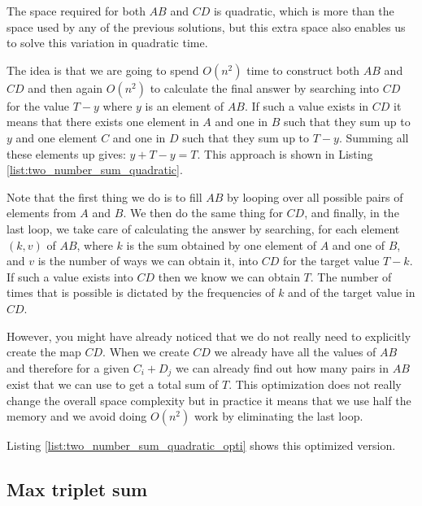 The space required for both $AB$ and $CD$ is quadratic, which is more than the space used by any of the previous solutions, but this extra space
also enables us to solve this variation in quadratic time. 

The idea is that we are going to spend $O(n^2)$ time to construct both $AB$ and $CD$
and then again $O(n^2)$ to calculate the final answer 
by searching into $CD$ for the value $T-y$ where $y$ is an element of $AB$. 
If such a value exists in $CD$ it means that there exists one element in  $A$ and one in $B$ such that they sum up to $y$ and
one element $C$ and one in $D$ such that they sum up to $T-y$. Summing all these elements up gives: $y+T-y = T$.
This approach is shown in Listing \ref{list:two_number_sum_quadratic}. 



Note that the first thing we do is to fill $AB$ by looping over all possible pairs of elements from $A$ and $B$.
We then do the same thing for $CD$, and finally, in the last loop, we take care of calculating the answer by searching, for each element $(k,v)$ of $AB$, where $k$ is the sum obtained by one element of $A$ and one of $B$, and $v$ is the number of ways we can obtain it,
into $CD$ for the target value $T-k$. If such a value exists into $CD$ then we know we can obtain $T$. The number of times
that is possible is dictated by the frequencies of $k$ and of the target value in $CD$.

However, you might have already noticed that we do not really need to explicitly create the map $CD$. 
When we create $CD$ we already have all the values of $AB$  and therefore for a given $C_i+D_j$ we can already find out how many pairs in $AB$ exist that we can use to get a total sum of $T$. 
This optimization does not really change the overall space complexity
but in practice it means that we use half the memory and we avoid doing $O(n^2)$ work by eliminating the last loop.

Listing \ref{list:two_number_sum_quadratic_opti} shows this optimized version.



\subsection{Max triplet sum}
